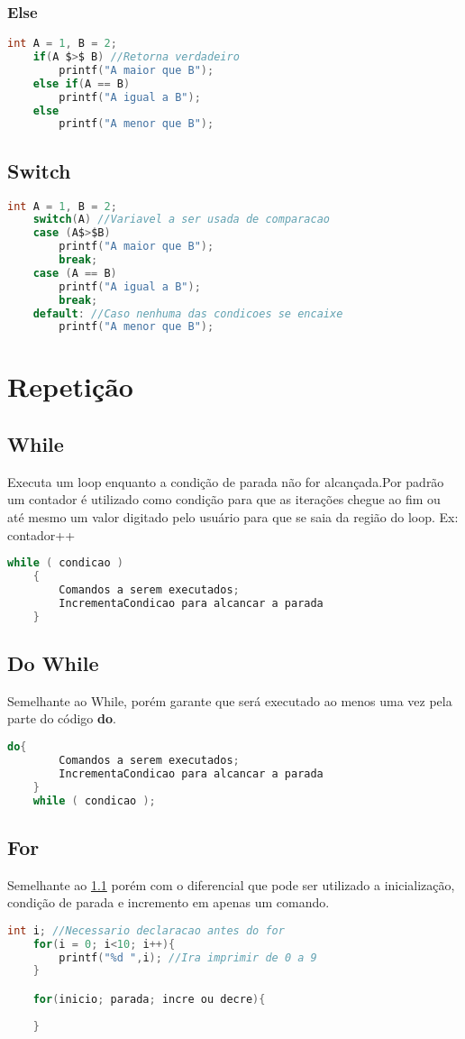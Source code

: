 \documentclass[12pt]{article}
\begin{document}
\subsubsection{Else}
\begin{lstlisting}[language=C,mathescape=true]
	int A = 1, B = 2;
	if(A $>$ B) //Retorna verdadeiro
		printf("A maior que B");
	else if(A == B)
		printf("A igual a B");
	else
		printf("A menor que B");
\end{lstlisting}
\subsection{Switch}
\begin{lstlisting}[language=C,mathescape=true]
	int A = 1, B = 2;
	switch(A) //Variavel a ser usada de comparacao
	case (A$>$B)
		printf("A maior que B");
		break;
	case (A == B)
		printf("A igual a B");
		break;
	default: //Caso nenhuma das condicoes se encaixe
		printf("A menor que B");
\end{lstlisting}

\section{Repetição}
\subsection{While}\label{while}
Executa um loop enquanto a condição de parada não for alcançada.Por padrão um contador é utilizado como condição para que as iterações chegue ao fim ou até mesmo um valor digitado pelo usuário para que se saia da região do loop. Ex: contador++
\begin{lstlisting}[language=C,mathescape=true]
	while ( condicao ) 
	{ 
		Comandos a serem executados; 
		IncrementaCondicao para alcancar a parada
	}  
\end{lstlisting}

\subsection{Do While}
Semelhante ao While, porém garante que será executado ao menos uma vez pela parte do código \textbf{do}.
\begin{lstlisting}[language=C,mathescape=true]
	do{
		Comandos a serem executados;
		IncrementaCondicao para alcancar a parada
	}
	while ( condicao ); 
\end{lstlisting}
\subsection{For}
Semelhante ao \ref{while} porém com o diferencial que pode ser utilizado a inicialização, condição de parada e incremento em apenas um comando.
\begin{lstlisting}[language=C,mathescape=true]
	int i; //Necessario declaracao antes do for
	for(i = 0; i<10; i++){
		printf("%d ",i); //Ira imprimir de 0 a 9
	}

	for(inicio; parada; incre ou decre){
		
	}
\end{lstlisting}



\end{document}

